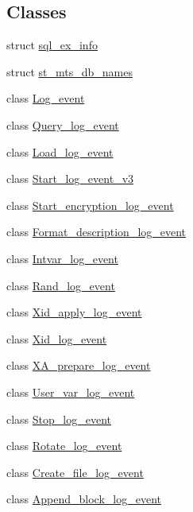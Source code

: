 \subsection*{Classes}
\begin{DoxyCompactItemize}
\item 
struct \mbox{\hyperlink{structsql__ex__info}{sql\+\_\+ex\+\_\+info}}
\item 
struct \mbox{\hyperlink{structst__mts__db__names}{st\+\_\+mts\+\_\+db\+\_\+names}}
\item 
class \mbox{\hyperlink{classLog__event}{Log\+\_\+event}}
\item 
class \mbox{\hyperlink{classQuery__log__event}{Query\+\_\+log\+\_\+event}}
\item 
class \mbox{\hyperlink{classLoad__log__event}{Load\+\_\+log\+\_\+event}}
\item 
class \mbox{\hyperlink{classStart__log__event__v3}{Start\+\_\+log\+\_\+event\+\_\+v3}}
\item 
class \mbox{\hyperlink{classStart__encryption__log__event}{Start\+\_\+encryption\+\_\+log\+\_\+event}}
\item 
class \mbox{\hyperlink{classFormat__description__log__event}{Format\+\_\+description\+\_\+log\+\_\+event}}
\item 
class \mbox{\hyperlink{classIntvar__log__event}{Intvar\+\_\+log\+\_\+event}}
\item 
class \mbox{\hyperlink{classRand__log__event}{Rand\+\_\+log\+\_\+event}}
\item 
class \mbox{\hyperlink{classXid__apply__log__event}{Xid\+\_\+apply\+\_\+log\+\_\+event}}
\item 
class \mbox{\hyperlink{classXid__log__event}{Xid\+\_\+log\+\_\+event}}
\item 
class \mbox{\hyperlink{classXA__prepare__log__event}{X\+A\+\_\+prepare\+\_\+log\+\_\+event}}
\item 
class \mbox{\hyperlink{classUser__var__log__event}{User\+\_\+var\+\_\+log\+\_\+event}}
\item 
class \mbox{\hyperlink{classStop__log__event}{Stop\+\_\+log\+\_\+event}}
\item 
class \mbox{\hyperlink{classRotate__log__event}{Rotate\+\_\+log\+\_\+event}}
\item 
class \mbox{\hyperlink{classCreate__file__log__event}{Create\+\_\+file\+\_\+log\+\_\+event}}
\item 
class \mbox{\hyperlink{classAppend__block__log__event}{Append\+\_\+block\+\_\+log\+\_\+event}}
\item 

\end{DoxyCompactItemize}
